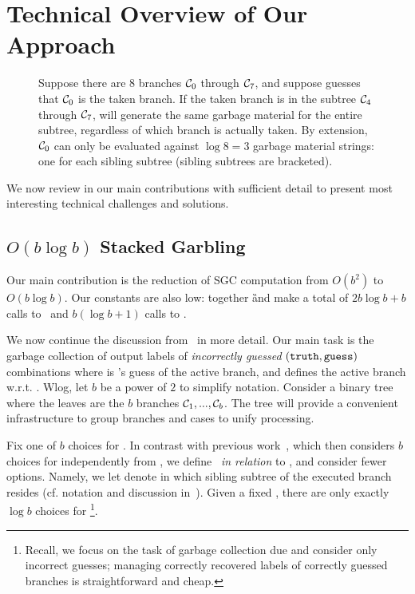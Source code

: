 
\section{Technical Overview of Our Approach}
\label{sec:techOverview}

\begin{figure*}[t]
  \centering
  
  \caption{%
    Suppose there are $8$ branches $\mathcal C_0$ through $\mathcal C_7$, and
    suppose \E guesses that $\mathcal C_0$ is the taken branch.
    If the taken branch is in the subtree $\mathcal C_4$ through $\mathcal C_7$,
    \E will generate the same garbage material for the entire subtree,
    regardless of which branch is actually taken.
    By extension, $\mathcal C_0$ can only be evaluated against $\log 8 = 3$ garbage
    material strings: one for each sibling subtree (sibling subtrees
    are bracketed).
  }\label{fig:seed-tree}
\end{figure*}

We  now review in our main contributions with sufficient  detail to present most interesting  technical challenges and  solutions.

\subsection{$O(b\log b)$ Stacked Garbling}
\label{sec:techOverviewSG}

Our main contribution is the reduction of SGC computation
from $O(b^2)$ to $O(b \log b)$.  Our constants are also
low: together \G and \E make a total of $2 b \log b + b$ calls to \Gb\
and $b(\log b + 1)$ calls  to \Ev.

We now continue the discussion from~ in more detail.
Our main task is the garbage collection of output labels of {\em
incorrectly guessed} $(\mathtt{truth}, \mathtt{guess})$ combinations 
where
\guess is \E's guess of the active branch, and \truth defines the active branch w.r.t. \guess.
Wlog, let $b$ be a power of $2$ to simplify notation.
Consider a binary tree where the leaves are the $b$ branches $\mathcal C_1,...,\mathcal C_b$.  The tree will provide a convenient infrastructure to group branches and cases to unify processing.


Fix one of $b$ choices for \guess.  In contrast with previous work~\HK, which then considers $b$ choices for \truth independently from \guess, we define \truth\ {\em in relation} to \guess, and consider fewer \truth options.  Namely,
we  let \truth  denote in which sibling subtree of \guess the executed branch resides (cf. notation and discussion in~). 
Given a fixed \guess, there are only exactly  $\log b$ choices for \truth\footnote{Recall, we focus on the task of garbage collection due and consider only  incorrect guesses;  managing correctly recovered labels of correctly guessed branches is straightforward and cheap.}.

